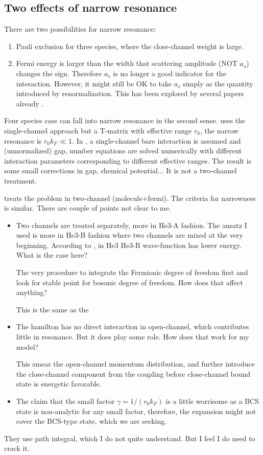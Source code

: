 \subsection{Two effects of narrow resonance}
There are two possibilities for narrow resonance:  
\begin{enumerate}
\item Pauli exclusion for three species, where the close-channel weight is large.  
\item Fermi energy is larger than the width that scattering amplitude (NOT $a_{s}$) changes the sign.  Therefore $a_{s}$ is no longer a good indicator for the interaction.  However, it might still be OK to take $a_{s}$ simply as the quantity introduced by renormalization.   This has been explored by several papers already \cite{NarrowJensen1,NarrowJensen,GurarieNarrow}.  
\end{enumerate}
Four species case can fall into narrow resonance in  the second sense.  \cite{NarrowJensen1,NarrowJensen} uses the single-channel approach but a T-matrix with effective range $r_{0}$, the narrow resonance is $r_{0}k_{F}\ll1$.  In \cite{NarrowJensen}, a single-channel bare interaction is assumed and (unnormalized) gap, number equations  are  solved numerically with different interaction parameters corresponding to different effective ranges. The result is some small corrections in gap, chemical potential...   It is not a two-channel treatment.  

\cite{GurarieNarrow} treats the problem in two-channel (molecule+fermi).  The criteria for narrowness is similar.  There are couple of points not clear to me.   
\begin{itemize}
\item Two channels are treated separately, more in He3-A fashion.  The ansatz I used is more in He3-B fashion where two channels are mixed at the very beginning.   According to \cite{He3B}, in He3 He3-B wave-function has lower energy.  What is the case here?

The very procedure to integrate the Fermionic degree of freedom first and look for stable point for bosonic degree of freedom.  How does that affect anything? 

This is the same as the 
\item The hamilton has no direct interaction in open-channel, which contributes little in resonance.  But it does play some role.  How does that work for my model? 

This smear the open-channel momentum distribution, and further introduce the close-channel component from the coupling before close-channel bound state is energetic favorable.  

\item The claim that the small factor $\gamma=1/(r_{0}k_{F})$ is a little worrisome as a BCS state is non-analytic for any small factor, therefore, the expansion might not cover the BCS-type state, which we are seeking.  
\end{itemize}
They use path integral, which I do not quite understand.  But I feel I do need to crack it.  

